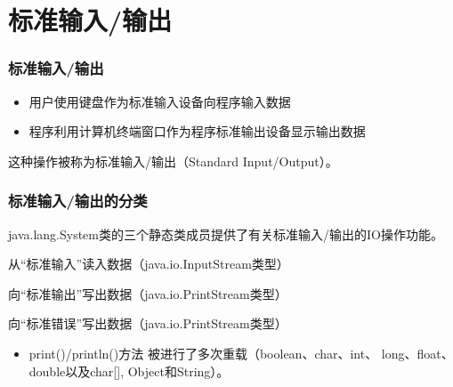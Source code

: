 \section{标准输入/输出}

\begin{frame}[fragile] %
  \frametitle{标准输入/输出}


  \begin{itemize}
  \item 用户使用键盘作为{\hei 标准输入设备}向程序输入数据
  \item 程序利用计算机终端窗口作为{\hei 程序标准输出设备}显示输出数据
  \end{itemize}

  这种操作被称为{\hei 标准输入/输出（Standard Input/Output）}。

\end{frame}

\begin{frame}[fragile] %
  \frametitle{标准输入/输出的分类}

  \begin{block}{}
    java.lang.System类的三个静态类成员提供了有关标准输入/输出的IO操作功能。
  \end{block}

  \begin{description}\kai
  \item [System.in] 从“标准输入”读入数据（java.io.InputStream类型）
  \item [System.out] 向“标准输出”写出数据（java.io.PrintStream类型）
  \item [System.err] 向“标准错误”写出数据（java.io.PrintStream类型）
  \end{description}

  \pause
  
  
  \begin{itemize}
  \item print()/println()方法 被进行了多次重载（boolean、char、int、 long、float、
    double以及char[], Object和String）。
  \end{itemize}
\end{frame}

